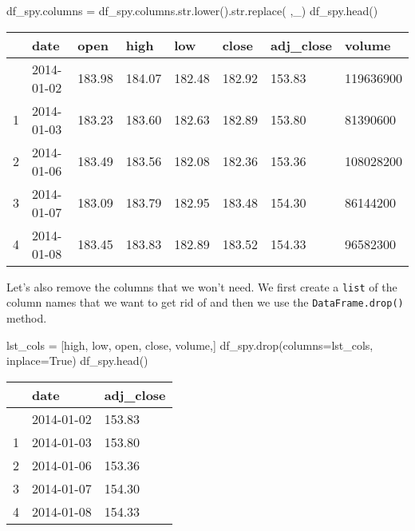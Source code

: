 \documentclass[
  letterpaper,
  DIV=11,
  numbers=noendperiod]{scrreprt}
\newenvironment{Shaded}{\begin{snugshade}}{\end{snugshade}}
\newcommand{\BuiltInTok}[1]{\textcolor[rgb]{0.00,0.23,0.31}{#1}}
\newcommand{\NormalTok}[1]{\textcolor[rgb]{0.00,0.23,0.31}{#1}}
\newcommand{\OperatorTok}[1]{\textcolor[rgb]{0.37,0.37,0.37}{#1}}
\newcommand{\StringTok}[1]{\textcolor[rgb]{0.13,0.47,0.30}{#1}}
\newcommand{\VariableTok}[1]{\textcolor[rgb]{0.07,0.07,0.07}{#1}}
\begin{document}
\begin{Shaded}
\begin{Highlighting}[]
\NormalTok{df\_spy.columns }\OperatorTok{=}\NormalTok{ df\_spy.columns.}\BuiltInTok{str}\NormalTok{.lower().}\BuiltInTok{str}\NormalTok{.replace(}\StringTok{\textquotesingle{} \textquotesingle{}}\NormalTok{,}\StringTok{\textquotesingle{}\_\textquotesingle{}}\NormalTok{)}
\NormalTok{df\_spy.head()}
\end{Highlighting}
\end{Shaded}

\begin{longtable}[]{@{}llllllll@{}}
\toprule\noalign{}
& date & open & high & low & close & adj\_close & volume \\
\midrule\noalign{}
\endhead
\bottomrule\noalign{}
\endlastfoot
0 & 2014-01-02 & 183.98 & 184.07 & 182.48 & 182.92 & 153.83 &
119636900 \\
1 & 2014-01-03 & 183.23 & 183.60 & 182.63 & 182.89 & 153.80 &
81390600 \\
2 & 2014-01-06 & 183.49 & 183.56 & 182.08 & 182.36 & 153.36 &
108028200 \\
3 & 2014-01-07 & 183.09 & 183.79 & 182.95 & 183.48 & 154.30 &
86144200 \\
4 & 2014-01-08 & 183.45 & 183.83 & 182.89 & 183.52 & 154.33 &
96582300 \\
\end{longtable}

Let's also remove the columns that we won't need. We first create a
\texttt{list} of the column names that we want to get rid of and then we
use the \texttt{DataFrame.drop()} method.

\begin{Shaded}
\begin{Highlighting}[]
\NormalTok{lst\_cols }\OperatorTok{=}\NormalTok{ [}\StringTok{\textquotesingle{}high\textquotesingle{}}\NormalTok{, }\StringTok{\textquotesingle{}low\textquotesingle{}}\NormalTok{, }\StringTok{\textquotesingle{}open\textquotesingle{}}\NormalTok{, }\StringTok{\textquotesingle{}close\textquotesingle{}}\NormalTok{, }\StringTok{\textquotesingle{}volume\textquotesingle{}}\NormalTok{,]}
\NormalTok{df\_spy.drop(columns}\OperatorTok{=}\NormalTok{lst\_cols, inplace}\OperatorTok{=}\VariableTok{True}\NormalTok{)}
\NormalTok{df\_spy.head()}
\end{Highlighting}
\end{Shaded}

\begin{longtable}[]{@{}lll@{}}
\toprule\noalign{}
& date & adj\_close \\
\midrule\noalign{}
\endhead
\bottomrule\noalign{}
\endlastfoot
0 & 2014-01-02 & 153.83 \\
1 & 2014-01-03 & 153.80 \\
2 & 2014-01-06 & 153.36 \\
3 & 2014-01-07 & 154.30 \\
4 & 2014-01-08 & 154.33 \\
\end{longtable}
\end{document}
